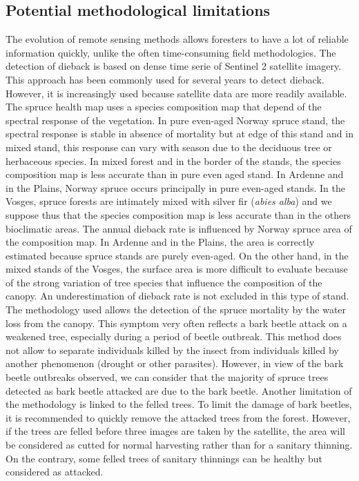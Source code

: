 \documentclass[3p,procedia]{elsarticle}
\begin{document}
\subsection{Potential methodological limitations}
The evolution of remote sensing methods allows foresters to have a lot of reliable information quickly, unlike the often time-consuming field methodologies.
The detection of dieback is based on dense time serie of Sentinel 2 satellite imagery. This approach has been commonly used for several years to detect dieback. However, it is increasingly used because satellite data are more readily available.
The spruce health map uses a species composition map that depend of the spectral response of the vegetation.
In pure even-aged Norway spruce stand, the spectral response is stable in absence of mortality but at edge of this stand and in mixed stand, this response can vary with season due to the deciduous tree or herbaceous species.
In mixed forest and in the border of the stands, the species composition map is less accurate than in pure even aged stand.
In Ardenne and in the Plains, Norway spruce occurs principally in pure even-aged stands.
In the Vosges, spruce forests are intimately mixed with silver fir (\textit{abies alba}) and we suppose thus that the species composition map is less accurate than in the others bioclimatic areas.
The annual dieback rate is influenced by Norway spruce area of the composition map.
In Ardenne and in the Plains, the area is correctly estimated because spruce stands are purely even-aged.
On the other hand, in the mixed stands of the Vosges, the surface area is more difficult to evaluate because of the strong variation of tree species that influence the composition of the canopy.
An underestimation of dieback rate is not excluded in this type of stand.
The methodology used allows the detection of the spruce mortality by the water loss from the canopy. This symptom very often reflects a bark beetle attack on a weakened tree, especially during a period of beetle outbreak. This method does not allow to separate individuals killed by the insect from individuals killed by another phenomenon (drought or other parasites). However, in view of the bark beetle outbreaks observed, we can consider that the majority of spruce trees detected as bark beetle attacked are due to the bark beetle.
Another limitation of the methodology is linked to the felled trees.
To limit the damage of bark beetles, it is recommended to quickly remove the attacked trees from the forest.
However, if the trees are felled before three images are taken by the satellite, the area will be considered as cutted for normal harvesting  rather than for a sanitary thinning.
On the contrary, some felled trees of sanitary thinnings can be healthy but considered as attacked.
\end{document}
